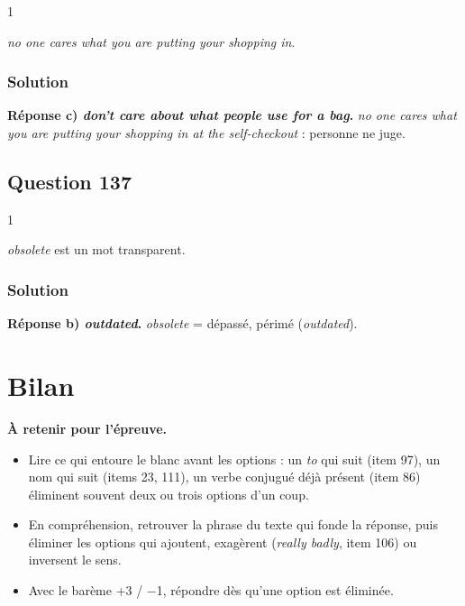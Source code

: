 \documentclass[11pt,a4paper]{article}
\providecommand{\tightlist}{\setlength{\itemsep}{0pt}\setlength{\parskip}{0pt}}
\begin{document}
\begin{indication}{1}

\emph{no one cares what you are putting your shopping in}.

\end{indication}

\hypertarget{solution-135}{%
\subsubsection{Solution}\label{solution-135}}

\textbf{Réponse c) \emph{don't care about what people use for a bag}.} \emph{no one cares what you are putting your shopping in at the self-checkout} : personne ne juge.

\hypertarget{question-137}{%
\subsection{Question 137}\label{question-137}}

\begin{indication}{1}

\emph{obsolete} est un mot transparent.

\end{indication}

\hypertarget{solution-136}{%
\subsubsection{Solution}\label{solution-136}}

\textbf{Réponse b) \emph{outdated}.} \emph{obsolete} = dépassé, périmé (\emph{outdated}).

\hypertarget{bilan}{%
\section{Bilan}\label{bilan}}

\textbf{À retenir pour l'épreuve.}

\begin{itemize}
\tightlist
\item
  Lire ce qui entoure le blanc avant les options : un \emph{to} qui suit (item 97), un nom qui suit (items 23, 111), un verbe conjugué déjà présent (item 86) éliminent souvent deux ou trois options d'un coup.
\item
  En compréhension, retrouver la phrase du texte qui fonde la réponse, puis éliminer les options qui ajoutent, exagèrent (\emph{really badly}, item 106) ou inversent le sens.
\item
  Avec le barème +3 / −1, répondre dès qu'une option est éliminée.
\end{itemize}
\end{document}
